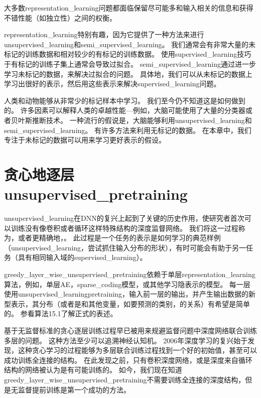 大多数\gls{representation_learning}问题都面临保留尽可能多和输入相关的信息和获得不错性能（如独立性）之间的权衡。


\gls{representation_learning}特别有趣，因为它提供了一种方法来进行\gls{unsupervised_learning}和\gls{semi_supervised_learning}。
我们通常会有非常大量的未标记的训练数据和相对较少的有标记的训练数据。
使用\gls{supervised_learning}技巧于有标记的训练子集上通常会导致过拟合。
\gls{semi_supervised_learning}通过进一步学习未标记的数据，来解决过拟合的问题。
具体地，我们可以从未标记的数据上学习出很好的表示，然后用这些表示来解决\gls{supervised_learning}问题。


人类和动物能够从非常少的标记样本中学习。
我们至今仍不知道这是如何做到的。
许多因素可以解释人类的卓越性能---例如，大脑可能使用了大量的分类器或者贝叶斯推断技术。
一种流行的假说是，大脑能够利用\gls{unsupervised_learning}和\gls{semi_supervised_learning}。
有许多方法来利用无标记的数据。
在本章中，我们专注于未标记的数据可以用来学习更好表示的假设。


\section{贪心地逐层\gls{unsupervised_pretraining}}
\label{sec:greedy_layer_wise_unsupervised_pretraining}
\gls{unsupervised_learning}在\gls{DNN}的复兴上起到了关键的历史作用，使研究者首次可以训练没有像卷积或者循环这样特殊结构的深度监督网络。
我们将这一过程称为，或者更精确地，。
此过程是一个任务的表示是如何学习的典范样例（\gls{unsupervised_learning}，尝试抓住输入分布的形状），有时可能会有助于另一任务（具有相同输入域的\gls{supervised_learning}）。


\gls{greedy_layer_wise_unsupervised_pretraining}依赖于单层\gls{representation_learning}算法，例如，单层\gls{AE}，\gls{sparse_coding}模型，或其他学习隐表示的模型。
每一层使用\gls{unsupervised_learning}\gls{pretraining}，输入前一层的输出，并产生输出数据的新型表示，其分布（或者是和其他变量，如要预测的类别，的关系）有希望是简单的。
参看算法15.1了解正式的表述。


基于无监督标准的贪心逐层训练过程早已被用来规避监督问题中深度网络联合训练多层的问题。
这种方法至少可以追溯神经认知机\citep{Fukushima75}。
2006年深度学习的复兴始于发现，这种贪心学习的过程能够为多层联合训练过程找到一个好的初始值，甚至可以成功训练全连接的结构\citep{Hinton06-small,Hinton-Science2006,HintonG2006,Bengio-nips-2006,ranzato-07-small}。
在此发现之前，只有卷积深度网络，或是深度来自循环结构的网络被认为是有可能训练的。
如今，我们现在知道\gls{greedy_layer_wise_unsupervised_pretraining}不需要训练全连接的深度结构，但是无监督提前训练是第一个成功的方法。


